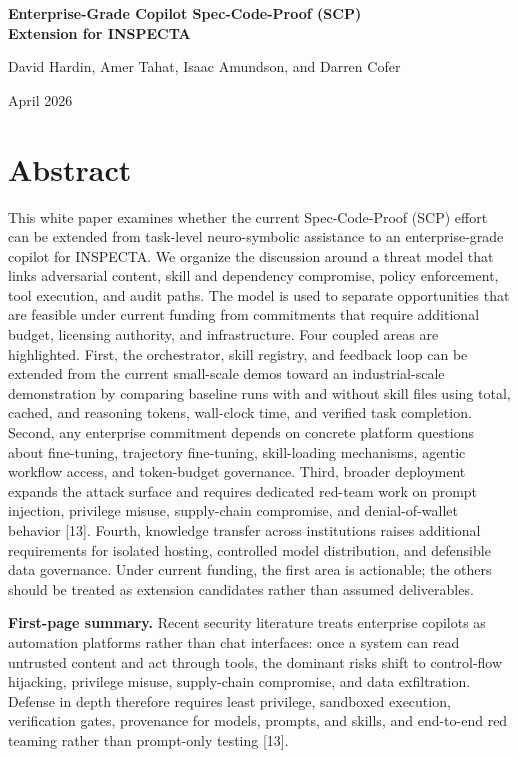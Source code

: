 \documentclass[11pt]{article}
\begin{document}
{\LARGE\bfseries\color{AccentBlue} Enterprise-Grade Copilot Spec-Code-Proof (SCP) \\ Extension for INSPECTA\par}
\vspace{0.35em}
{\large David Hardin, Amer Tahat, Isaac Amundson, and Darren Cofer\par}
{\normalsize April 2026\par}


\section*{Abstract}

This white paper examines whether the current Spec-Code-Proof (SCP) effort can be extended from task-level neuro-symbolic assistance to an enterprise-grade copilot for INSPECTA. We organize the discussion around a threat model that links adversarial content, skill and dependency compromise, policy enforcement, tool execution, and audit paths. The model is used to separate opportunities that are feasible under current funding from commitments that require additional budget, licensing authority, and infrastructure. Four coupled areas are highlighted. First, the orchestrator, skill registry, and feedback loop can be extended from the current small-scale demos toward an industrial-scale demonstration by comparing baseline runs with and without skill files using total, cached, and reasoning tokens, wall-clock time, and verified task completion. Second, any enterprise commitment depends on concrete platform questions about fine-tuning, trajectory fine-tuning, skill-loading mechanisms, agentic workflow access, and token-budget governance. Third, broader deployment expands the attack surface and requires dedicated red-team work on prompt injection, privilege misuse, supply-chain compromise, and denial-of-wallet behavior [13]. Fourth, knowledge transfer across institutions raises additional requirements for isolated hosting, controlled model distribution, and defensible data governance. Under current funding, the first area is actionable; the others should be treated as extension candidates rather than assumed deliverables.


\begin{summarybox}
\textbf{First-page summary.} Recent security literature treats enterprise copilots as automation platforms rather than chat interfaces: once a system can read untrusted content and act through tools, the dominant risks shift to control-flow hijacking, privilege misuse, supply-chain compromise, and data exfiltration. Defense in depth therefore requires least privilege, sandboxed execution, verification gates, provenance for models, prompts, and skills, and end-to-end red teaming rather than prompt-only testing [13].
\end{summarybox}
\end{document}
